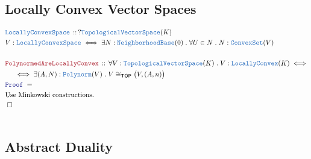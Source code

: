 \documentclass[12pt]{scrartcl}
\newcommand{\TYPE}[1]{\textcolor{NavyBlue}{\mathtt{#1}}}
\newcommand{\LOGIC}[1]{\textcolor{Blue}{\mathtt{#1}}}
\newcommand{\THM}[1]{\textcolor{Maroon}{\mathtt{#1}}}
\renewcommand{\.}{\; . \;}
\newcommand{\Theorem}[2]{& \THM{#1} \, :: \, #2 \\ & \Proof = \\ }
\newcommand{\DeclareType}[2]{& \TYPE{#1} \, :: \, #2 \\}
\newcommand{\DefineType}[3]{& #1 : \TYPE{#2} \iff #3 \\}
\newcommand{\NewLine}{\\ & \kern 1pc}
\newcommand{\Page}[1]{\begin{align*} #1 \end{align*} \newpage   }
\newcommand{\QED}{\; \square}
\newcommand{\EndProof}{& \QED \\}
\newcommand{\Proof}{\LOGIC{Proof} \; }
\newcommand{\TOP}{ \mathsf{TOP}  }
\newcommand{\TVS}{\TYPE{TopologicalVectorSpace}}
\begin{document}
\subsection{Locally Convex Vector Spaces}
\Page{
 \DeclareType{LocallyConvexSpace}{ ? \TVS(K)  }
 \DefineType{V}{LocallyConvexSpace}{ \exists N : \TYPE{NeighborhoodBase}(0) \. \forall U \in N \. N : \TYPE{ConvexSet}(V)  }
 \\
 \Theorem{PolynormedAreLocallyConvex}{ \forall V : \TVS(K) \. V : \TYPE{LocallyConvex}(K) \iff \NewLine \iff  \exists (A,N) : \TYPE{Polynorm}(V) \. V \cong_\TOP \big(V,(A,n)\big) }
 & \textrm{Use Minkowski constructions} . \\
 \EndProof
 \\
}
\subsection{Abstract Duality}
\end{document}
